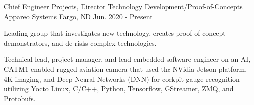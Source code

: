 

\begin{cventries}

  \cventry
    {Chief Engineer Projects, Director Technology Development/Proof-of-Concepts} %
    {Appareo Systems} %
    {Fargo, ND} %
    {Jun. 2020 - Present} %
    {
      \begin{cvitems} %
        \item {Leading group that investigates new technology, creates proof-of-concept demonstrators, and de-risks complex technologies.}
        \item {Technical lead, project manager, and lead embedded software engineer on an AI, CATM1 enabled rugged aviation camera that used the NVidia Jetson platform, 4K imaging, and Deep Neural Networks (DNN) for cockpit gauge recognition utilizing Yocto Linux, C/C++, Python, Tensorflow, GStreamer, ZMQ, and Protobufs.}
      \end{cvitems}
    }



\end{cventries}
